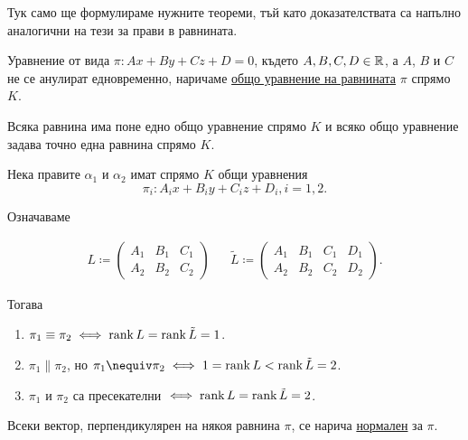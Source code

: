 \documentclass[numbers=endperiod, DIV=15]{scrartcl}
\begin{document}
Тук само ще формулираме нужните теореми, тъй като доказателствата са напълно аналогични на тези за прави в равнината.

\begin{definition}
  Уравнение от вида $\pi: Ax + By + Cz + D = 0$, където $A, B, C, D \in \mathbb{R}$, а $A$, $B$ и $C$ не се анулират едновременно, наричаме \underline{общо уравнение на равнината} $\pi$ спрямо $K$.
\end{definition}

\begin{proposition}
  Всяка равнина има поне едно общо уравнение спрямо $K$ и всяко общо уравнение задава точно една равнина спрямо $K$.
\end{proposition}

\begin{theorem}
  Нека правите $\alpha_1$ и $\alpha_2$ имат спрямо $K$ общи уравнения
  \begin{equation}\label{thm:line-position:scalar-equations}
    \pi_i : A_i x + B_i y + C_i z + D_i, i = 1, 2.
  \end{equation}

  Означаваме

  \begin{align*}
    L \coloneqq \begin{pmatrix}
      A_1 & B_1 & C_1 \\
      A_2 & B_2 & C_2
    \end{pmatrix}
    &&
    \tilde L \coloneqq \begin{pmatrix}
      A_1 & B_1 & C_1 & D_1 \\
      A_2 & B_2 & C_2 & D_2
    \end{pmatrix}.
  \end{align*}

  Тогава
  \begin{enumerate}
    \item $\pi_1 \equiv \pi_2 \iff \operatorname{rank} L = \operatorname{rank} \tilde L = 1$.
    \item $\pi_1 \parallel \pi_2$, но $\pi_1 \nequiv \pi_2 \iff 1 = \Rank L < \Rank \tilde L = 2$.
    \item $\pi_1$ и $\pi_2$ са пресекателни $\iff \operatorname{rank} L = \operatorname{rank} \tilde L = 2$.
  \end{enumerate}
\end{theorem}

\begin{definition}
  Всеки вектор, перпендикулярен на някоя равнина $\pi$, се нарича \underline{нормален} за $\pi$.
\end{definition}
\end{document}
